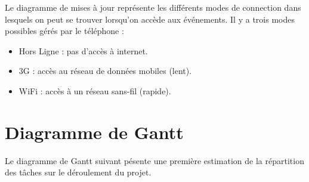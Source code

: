\documentclass [pdftex,12pt] {report}
\begin{document}
Le diagramme de mises à jour représente les différents modes de connection dans lesquels on peut se trouver lorsqu'on accède aux événements. Il y a trois modes possibles gérés par le téléphone :\\
\begin{itemize}
\renewcommand{\labelitemi}{$\bullet$}
 \item Hors Ligne : pas d'accès à internet.
 \item 3G :  accès au réseau de données mobiles (lent).
 \item WiFi : accès à un réseau sans-fil (rapide).
\end{itemize}

\section{Diagramme de Gantt}
Le diagramme de Gantt suivant pésente une première estimation de la répartition des tâches sur le déroulement du projet.
\end{document}
